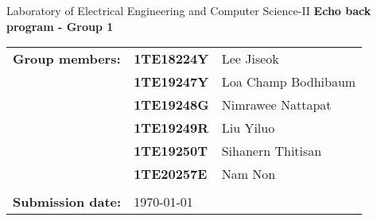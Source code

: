 \documentclass[10pt,a4paper]{article}
\begin{document}
\begin{spacing}{1.2}

    \begin{titlepage}
        \begin{center}
            \vspace*{6cm}
            \Large
            Laboratory of Electrical Engineering and Computer Science-II
            \vspace*{2cm}
            \Huge
            \textbf{Echo back program - Group 1}
        \end{center}
        \begin{tabular}{lll}
            \centering
            \Large \textbf{Group members:}   & \Large \textbf{1TE18224Y} & \Large Lee Jiseok          \\
                                      & \Large \textbf{1TE19247Y} & \Large Loa Champ Bodhibaum \\
                                      & \Large \textbf{1TE19248G} & \Large Nimrawee Nattapat   \\
                                      & \Large \textbf{1TE19249R} & \Large Liu Yiluo           \\
                                      & \Large \textbf{1TE19250T} & \Large Sihanern Thitisan   \\
                                      & \Large \textbf{1TE20257E} & \Large Nam Non             \\
                                      &                           &                            \\                        
            \Large \textbf{Submission date:} & \multicolumn{2}{l}{\Large \today}               
            \end{tabular}
        
        \end{titlepage}
    
    

\end{spacing}
\end{document}
